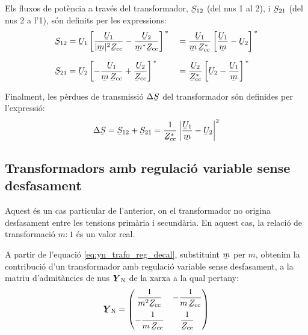 Els fluxos de potència a través del transformador, $\cmplx{S}_{12}$
(del nus 1 al 2), i $\cmplx{S}_{21}$ (del nus 2 a l'1), són definits
per les expressions: 
\begin{alignat}{2}
   \cmplx{S}_{12} &= \cmplx{U}_1 \left[ \frac{\cmplx{U}_1}{|\cmplx{m}|^2 \cmplx{Z}\ped{cc}} - \frac{\cmplx{U}_2}{\cmplx{m}^* \cmplx{Z}\ped{cc}} \right]^{\,*} &&= \frac{\cmplx{U}_1}{\cmplx{m}\, \cmplx{Z}\ped{cc}^*} \left[ \frac{\cmplx{U}_1}{\cmplx{m}} - \cmplx{U}_2 \right]^{\,*} \label{eq:s12_trafo_reg_decal} \\[1.5ex]
   \cmplx{S}_{21} &= \cmplx{U}_2 \left[ - \frac{\cmplx{U}_1}{\cmplx{m} \,\cmplx{Z}\ped{cc}} + \frac{\cmplx{U}_2} {\cmplx{Z}\ped{cc}} \right]^{\,*} &&= \frac{\cmplx{U}_2}{\cmplx{Z}\ped{cc}^*} \left[  \cmplx{U}_2 - \frac{\cmplx{U}_1}{\cmplx{m}}  \right]^{\,*} \label{eq:s21_trafo_reg_decal}
\end{alignat}

Finalment, les pèrdues de transmissió $\Delta\cmplx{S}$ del transformador són definides per l'expressió:
\begin{equation} \label{eq:ds_trafo_reg_decal}
   \Delta\cmplx{S} = \cmplx{S}_{12} + \cmplx{S}_{21} = \frac{1}{\cmplx{Z}\ped{cc}^*}  \left|
    \frac{\cmplx{U}_1}{\cmplx{m}} - \cmplx{U}_2 \right|^2
\end{equation}


\subsection{Transformadors amb regulació variable sense desfasament} \label{sec:trafo_reg}

Aquest és un cas particular de l'anterior, on el transformador no
origina desfasament entre les tensions primària i secundària.
En aquest cas, la relació de transformació $m\!:\!1$ és un valor real.

A partir de l'equació  \eqref{eq:yn_trafo_reg_decal}, substituint
$\cmplx{m}$ per $m$, obtenim la contribució d'un transformador amb
regulació variable sense desfasament, a la matriu d'admitàncies de nus
$\mcmplx{Y}\ped{N}$ de la xarxa a la qual pertany:
\begin{equation}
   \mcmplx{Y}\ped{N} = \begin{pmatrix}
     \dfrac{1}{m^2 \cmplx{Z}\ped{cc}} & - \dfrac{1}{m \,\cmplx{Z}\ped{cc}} \\[2.5ex]
     - \dfrac{1}{m \,\cmplx{Z}\ped{cc}} & \dfrac{1}{\cmplx{Z}\ped{cc}}
   \end{pmatrix}
\end{equation}

